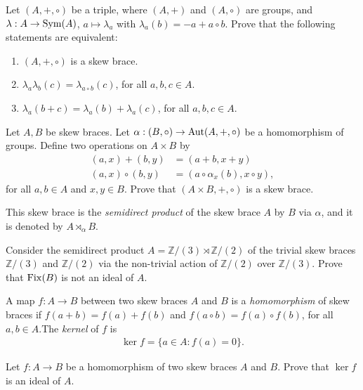 \begin{exercise}
    Let $(A,+,\circ)$ be a triple, where $(A,+)$ and $(A,\circ)$ are groups, and $\lambda: A \to \operatorname{Sym}(A)$, $a\mapsto \lambda_a$ with $\lambda_a(b)=-a+a\circ b$. Prove that the following statements are equivalent:
    \begin{enumerate}
        \item $(A,+,\circ)$ is a skew brace.
        \item $\lambda_a\lambda_b(c)=\lambda_{a\circ b}(c)$, for all $a,b,c\in A$.
        \item $\lambda_a(b+c) = \lambda_a(b)+\lambda_a(c)$, for all $a,b,c\in A$.
    \end{enumerate}
\end{exercise}

\begin{exercise}
    Let $A,B$ be skew braces. 
    Let $\alpha: (B,\circ)\to\operatorname{Aut}(A,+,\circ)$ be a homomorphism of groups. 
    Define two operations on $A\times B$ by
    \begin{align*}
        (a,x)+(b,y) &= (a+b,x+y)\\
        (a,x)\circ(b,y) &= (a\circ\alpha_{x}(b), x\circ y),
    \end{align*}
    for all $a,b\in A$ and $x,y\in B$. Prove that $(A\times B, +,\circ)$ is a skew brace. 
    
    This skew brace is the \emph{semidirect product} of the skew brace $A$ by $B$ via $\alpha$, and it is denoted by $A\rtimes_{\alpha}B$.
\end{exercise}

\begin{exercise}\label{ex:fix}
    Consider the semidirect product $A= \mathbb{Z}/(3) \rtimes \mathbb{Z}/(2)$ of the trivial
    skew braces $\mathbb{Z}/(3)$ and $\mathbb{Z}/(2)$ via the non-trivial action of $\mathbb{Z}/(2)$ over $\mathbb{Z}/(3)$.
    Prove that $\operatorname{Fix}(B) $ is not an ideal of $A$.
\end{exercise}

\begin{exercise}
     A map $f:A\to B$ between two skew braces $A$ and $B$ is a \emph{homomorphism} of skew braces if $f(a + b)= f(a) +f(b)$ and $f(a\circ b)= f(a)\circ f(b)$, for all $a,b\in A$.The \emph{kernel} of $f$ is
    \begin{align*}
        \ker f = \{a\in A\colon f(a)=0\}.
    \end{align*}
    
    Let $f:A\to B$ be a homomorphism of two skew braces $A$ and $B$. 
    Prove that $\ker f$ is an ideal of $A$.
\end{exercise}

